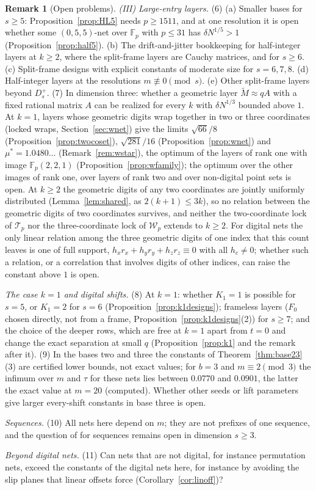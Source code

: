 \documentclass[11pt]{amsart}
\theoremstyle{definition}
\newtheorem{remark}[theorem]{Remark}
\theoremstyle{plain}
\newcommand{\F}{\mathbb{F}}
\begin{document}
\begin{remark}[Open problems]
\emph{(III) Large-entry layers.} (6) (a) Smaller bases for $s\ge5$: Proposition~\ref{prop:HL5} needs $p\ge1511$, and at one resolution it is open whether some $(0,5,5)$-net over $\F_p$ with $p\le31$ has $\delta N^{1/5}>1$ (Proposition~\ref{prop:half5}). (b) The drift-and-jitter bookkeeping for half-integer layers at $k\ge2$, where the split-frame layers are Cauchy matrices, and for $s\ge6$. (c) Split-frame designs with explicit constants of moderate size for $s=6,7,8$. (d) Half-integer layers at the resolutions $m\not\equiv0\pmod s$. (e) Other split-frame layers beyond $D_s^+$. (7) In dimension three: whether a geometric layer $\tilde M\approx qA$ with a fixed rational matrix $A$ can be realized for every $k$ with $\delta N^{1/3}$ bounded above $1$. At $k=1$, layers whose geometric digits wrap together in two or three coordinates (locked wraps, Section~\ref{sec:wnet}) give the limits $\sqrt{66}/8$ (Proposition~\ref{prop:twocoset}), $\sqrt{281}/16$ (Proposition~\ref{prop:wnet}) and $\mu^*=1.0480\ldots$ (Remark~\ref{rem:wstar}), the optimum of the layers of rank one with image $\F_p(2,2,1)$ (Proposition~\ref{prop:wfamily}); the optimum over the other images of rank one, over layers of rank two and over non-digital point sets is open. At $k\ge2$ the geometric digits of any two coordinates are jointly uniformly distributed (Lemma~\ref{lem:shared}, as $2(k+1)\le3k$), so no relation between the geometric digits of two coordinates survives, and neither the two-coordinate lock of $\mathcal T_p$ nor the three-coordinate lock of $\mathcal W_p$ extends to $k\ge2$. For digital nets the only linear relation among the three geometric digits of one index that this count leaves is one of full support, $h_xr_x+h_yr_y+h_zr_z\equiv0$ with all $h_c\ne0$; whether such a relation, or a correlation that involves digits of other indices, can raise the constant above $1$ is open.

\emph{The case $k=1$ and digital shifts.} (8) At $k=1$: whether $K_1=1$ is possible for $s=5$, or $K_1=2$ for $s=6$ (Proposition~\ref{prop:k1designs}); frameless layers ($F_0$ chosen directly, not from a frame, Proposition~\ref{prop:k1designs}(2)) for $s\ge7$; and the choice of the deeper rows, which are free at $k=1$ apart from $t=0$ and change the exact separation at small $q$ (Proposition~\ref{prop:k1} and the remark after it). (9) In the bases two and three the constants of Theorem~\ref{thm:base23}(3) are certified lower bounds, not exact values; for $b=3$ and $m\equiv2\pmod3$ the infimum over $m$ and $\tau$ for these nets lies between $0.0770$ and $0.0901$, the latter the exact value at $m=20$ (computed). Whether other seeds or lift parameters give larger every-shift constants in base three is open.

\emph{Sequences.} (10) All nets here depend on $m$; they are not prefixes of one sequence, and the question of \cite{DGS2} for sequences remains open in dimension $s\ge3$.

\emph{Beyond digital nets.} (11) Can nets that are not digital, for instance permutation nets, exceed the constants of the digital nets here, for instance by avoiding the slip planes that linear offsets force (Corollary~\ref{cor:linoff})?
\end{remark}
\end{document}
